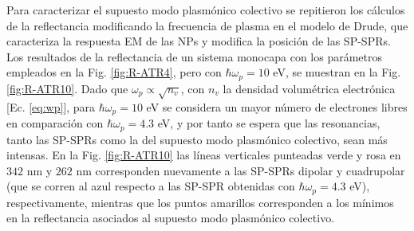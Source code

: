 Para caracterizar el supuesto modo plasmónico colectivo se repitieron los cálculos de la reflectancia modificando la frecuencia de plasma en el modelo de Drude, que caracteriza la respuesta EM de las NPs y modifica la posición de las SP-SPRs. Los resultados de la reflectancia de un sistema monocapa con los parámetros empleados en la Fig. \ref{fig:R-ATR4}, pero con $\hbar\omega_p = 10$ eV, se muestran en la Fig. \ref{fig:R-ATR10}. Dado que $\omega_p\propto\sqrt{n_v}$, con $n_v$ la densidad volumétrica electrónica [Ec. \eqref{eq:wp}], para $\hbar\omega_p = 10$ eV se considera un mayor número de electrones libres en comparación con $\hbar\omega_p=4.3$ eV, y por tanto se espera que las resonancias, tanto las SP-SPRs como la del supuesto modo plasmónico colectivo, sean más intensas. En la Fig. \ref{fig:R-ATR10} las líneas verticales punteadas verde y rosa en $342$ nm y $262$ nm corresponden nuevamente a las SP-SPRs dipolar y cuadrupolar (que se corren al azul respecto a las SP-SPR obtenidas con $\hbar\omega_p=4.3$ eV), respectivamente, mientras que los puntos amarillos corresponden a los mínimos en la reflectancia asociados al supuesto modo plasmónico colectivo.
				
